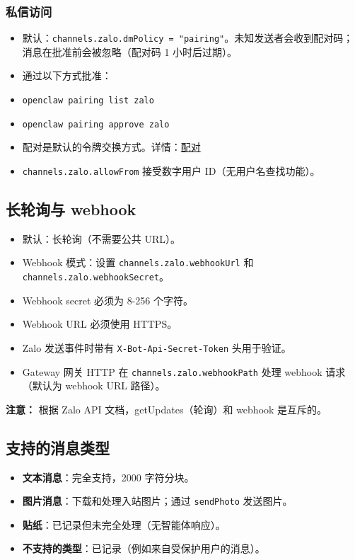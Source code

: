\subsubsection{私信访问}


\begin{itemize}
  \item 默认：\texttt{channels.zalo.dmPolicy = "pairing"}。未知发送者会收到配对码；消息在批准前会被忽略（配对码 1 小时后过期）。
  \item 通过以下方式批准：
  \item \texttt{openclaw pairing list zalo}
  \item \texttt{openclaw pairing approve zalo }
  \item 配对是默认的令牌交换方式。详情：\href{/channels/pairing}{配对}
  \item \texttt{channels.zalo.allowFrom} 接受数字用户 ID（无用户名查找功能）。
\end{itemize}


\subsection{长轮询与 webhook}


\begin{itemize}
  \item 默认：长轮询（不需要公共 URL）。
  \item Webhook 模式：设置 \texttt{channels.zalo.webhookUrl} 和 \texttt{channels.zalo.webhookSecret}。
  \item Webhook secret 必须为 8-256 个字符。
  \item Webhook URL 必须使用 HTTPS。
  \item Zalo 发送事件时带有 \texttt{X-Bot-Api-Secret-Token} 头用于验证。
  \item Gateway 网关 HTTP 在 \texttt{channels.zalo.webhookPath} 处理 webhook 请求（默认为 webhook URL 路径）。
\end{itemize}


\textbf{注意：} 根据 Zalo API 文档，getUpdates（轮询）和 webhook 是互斥的。

\subsection{支持的消息类型}


\begin{itemize}
  \item \textbf{文本消息}：完全支持，2000 字符分块。
  \item \textbf{图片消息}：下载和处理入站图片；通过 \texttt{sendPhoto} 发送图片。
  \item \textbf{贴纸}：已记录但未完全处理（无智能体响应）。
  \item \textbf{不支持的类型}：已记录（例如来自受保护用户的消息）。
\end{itemize}


